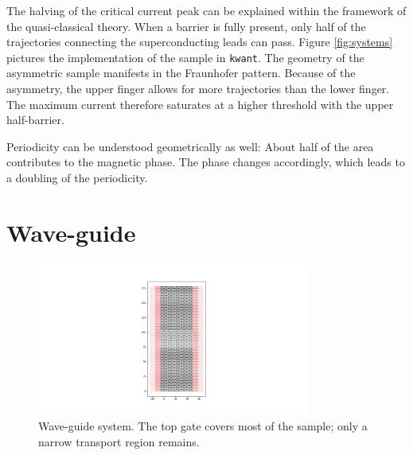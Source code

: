 The halving of the critical current peak can be explained within the framework of the quasi-classical theory. When a barrier is fully present, only half of the trajectories connecting the superconducting leads can pass. Figure \ref{fig:systems} pictures the implementation of the sample in \texttt{kwant}. The geometry of the asymmetric sample manifests in the Fraunhofer pattern. Because of the asymmetry, the upper finger allows for more trajectories than the lower finger. The maximum current therefore saturates at a higher threshold with the upper half-barrier.

Periodicity can be understood geometrically as well: About half of the area contributes to the magnetic phase. The phase changes accordingly, which leads to a doubling of the periodicity.

\section{Wave-guide}

\begin{figure}
\centering
\includegraphics[width=0.8\textwidth]{figure/numericalmodel/waveguide}
\caption{Wave-guide system. The top gate covers most of the sample; only a narrow transport region remains.}\label{fig:waveguide-system}
\end{figure}

